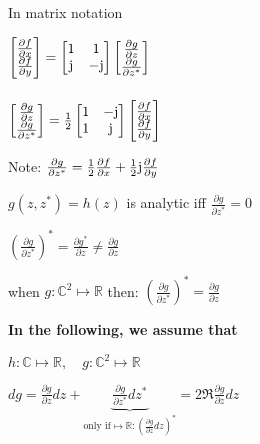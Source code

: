 In matrix notation\ 
\begin{doublespace}


\quad $  	\begin{bmatrix} \frac{\partial f}{\partial x} \\
	 \frac{\partial f}{\partial y}\end{bmatrix} =
    	\begin{bmatrix}  1 & 1 \\  \mathrm{j} & -\mathrm{j}  \end{bmatrix}
    \begin{bmatrix}  \frac{\partial g}{\partial z} \\
     \frac{\partial g}{\partial z^*} \end{bmatrix}$\ \\ \ \\
     
\quad $  	\begin{bmatrix} \frac{\partial g}{\partial z} \\
	 \frac{\partial g}{\partial z^*}\end{bmatrix} =
    	\frac{1}{2}\begin{bmatrix}  1 & -\mathrm{j} \\  1 & \mathrm{j}  \end{bmatrix}
    \begin{bmatrix}  \frac{\partial f}{\partial x} \\
     \frac{\partial f}{\partial y} \end{bmatrix}$ \ \\
\end{doublespace}
Note: $\frac{\partial g}{\partial z^*} = \frac{1}{2}\frac{\partial f}{\partial x} +\frac{1}{2} \mathrm{j}\frac{\partial f}{\partial y}$

$g(z,z^*)=h(z)$ is analytic iff $\frac{\partial g}{\partial z^*}=0$

$(\frac{\partial g}{\partial z^*})^*=\frac{\partial g^*}{\partial z}\neq \frac{\partial g}{\partial z}$  

 when $g: \mathbb{C}^2 \mapsto \mathbb{R}$ then: $(\frac{\partial g}{\partial z^*})^*= \frac{\partial g}{\partial z}$

\textbf{In the following, we assume that}

$h:\mathbb{C}\mapsto\mathbb{R},\quad g:\mathbb{C}^2\mapsto\mathbb{R}$

$dg=\frac{\partial g}{\partial z}dz+\underbrace{\frac{\partial g}{\partial z^*}dz^*}_{\text{only if} \mapsto \mathbb{R}: (\frac{\partial g}{\partial z}dz)^*} = 2\Re{\frac{\partial g}{\partial z}dz}$

